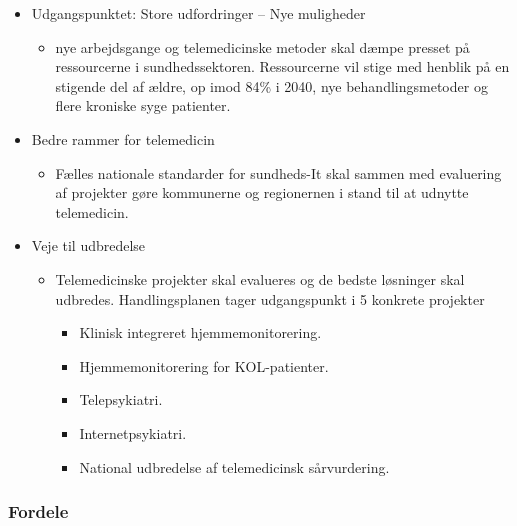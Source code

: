 \begin{itemize} 
	\item Udgangspunktet: Store udfordringer – Nye muligheder
		\begin{itemize} 

			\item nye arbejdsgange og telemedicinske metoder skal dæmpe presset på ressourcerne i sundhedssektoren. Ressourcerne vil stige med henblik på en stigende del af ældre, op imod 84\% i 2040, nye behandlingsmetoder og flere kroniske syge patienter.

		\end{itemize} 

	\item Bedre rammer for telemedicin
		\begin{itemize} 

			\item Fælles nationale standarder for sundheds-It skal sammen med evaluering af projekter gøre kommunerne og regionernen i stand til at udnytte telemedicin.

		\end{itemize} 

	\item Veje til udbredelse
		\begin{itemize} 

			\item Telemedicinske projekter skal evalueres og de bedste løsninger skal udbredes. Handlingsplanen tager udgangspunkt i 5 konkrete projekter

				\begin{itemize} 

					\item Klinisk integreret hjemmemonitorering.
					\item Hjemmemonitorering for KOL-patienter.
					\item Telepsykiatri.
					\item Internetpsykiatri.
					\item National udbredelse af telemedicinsk sårvurdering.

				\end{itemize} 

		\end{itemize} 

		
\end{itemize} 


\subsubsection{Fordele}

